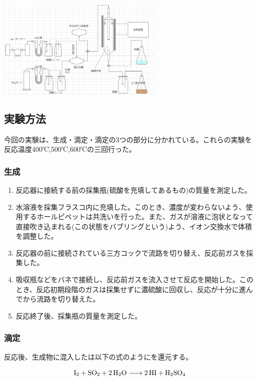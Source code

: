 \documentclass{ltjsarticle}
\begin{document}
\includegraphics[width=8cm]{反応装置図.png}

\subsection{実験方法}

今回の実験は、生成・滴定・滴定の3つの部分に分かれている。これらの実験を反応温度400℃,500℃,600℃の三回行った。

\subsubsection{生成}

\begin{enumerate}
    \item 反応器に接続する前の採集瓶(硫酸を充填してあるもの)の質量を測定した。
    \item {}水溶液を採集フラスコ内に充填した。このとき、濃度が変わらないよう、使用するホールピペットは共洗いを行った。また、ガスが溶液に泡状となって直接吹き込まれる(この状態をバブリングという)よう、イオン交換水で体積を調整した。
    \item 反応器の前に接続されている三方コックで流路を切り替え、反応前ガスを採集した。
    \item 吸収瓶などをバネで接続し、反応前ガスを流入させて反応を開始した。このとき、反応初期段階のガスは採集せずに濃硫酸に回収し、反応が十分に進んでから流路を切り替えた。
    \item 反応終了後、採集瓶の質量を測定した。
\end{enumerate}

\subsubsection{滴定}

反応後、生成物に混入したは以下の式のようにを還元する。

\begin{equation}
    \ce{I2 + SO2 + 2H2O -> 2HI + H2SO4}
\end{equation}
\end{document}
